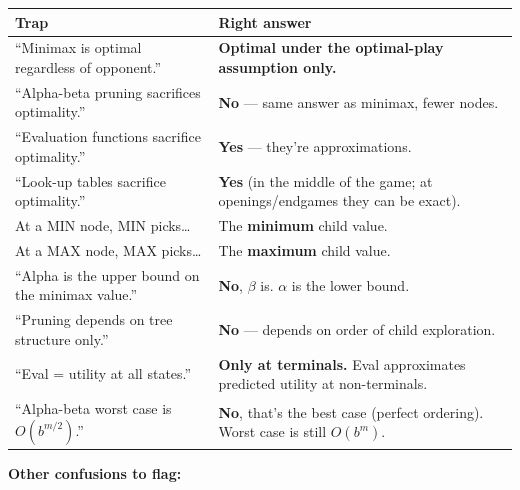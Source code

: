 \documentclass[11pt, a4paper]{article}
\newcommand{\thead}[1]{\textbf{#1}}
\begin{document}
\begin{trapbox}[summary]
\begin{tabular}{@{}p{6.5cm}p{8cm}@{}}
\toprule
\thead{Trap} & \thead{Right answer} \\
\midrule
``Minimax is optimal regardless of opponent.''     & \textbf{Optimal under the optimal-play assumption only.} \\
``Alpha-beta pruning sacrifices optimality.''       & \textbf{No} — same answer as minimax, fewer nodes. \\
``Evaluation functions sacrifice optimality.''      & \textbf{Yes} — they're approximations. \\
``Look-up tables sacrifice optimality.''            & \textbf{Yes} (in the middle of the game; at openings/endgames they can be exact). \\
At a MIN node, MIN picks\dots                       & The \textbf{minimum} child value. \\
At a MAX node, MAX picks\dots                       & The \textbf{maximum} child value. \\
``Alpha is the upper bound on the minimax value.'' & \textbf{No}, $\beta$ is. $\alpha$ is the lower bound. \\
``Pruning depends on tree structure only.''         & \textbf{No} — depends on order of child exploration. \\
``Eval = utility at all states.''                   & \textbf{Only at terminals.} Eval approximates predicted utility at non-terminals. \\
``Alpha-beta worst case is $O(b^{m/2})$.''         & \textbf{No}, that's the best case (perfect ordering). Worst case is still $O(b^m)$. \\
\bottomrule
\end{tabular}
\end{trapbox}

\textbf{Other confusions to flag:}
\end{document}
